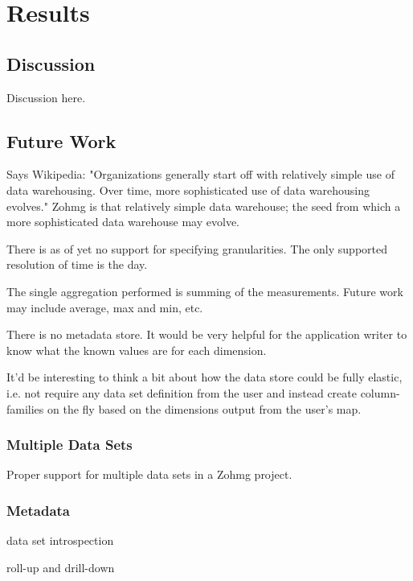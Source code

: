 \chapter{Results}



\section{Discussion}

Discussion here.


\section{Future Work}

Says Wikipedia: "Organizations generally start off with relatively simple use
of data warehousing. Over time, more sophisticated use of data warehousing
evolves." Zohmg is that relatively simple data warehouse; the seed from which
a more sophisticated data warehouse may evolve.

There is as of yet no support for specifying granularities. The only supported
resolution of time is the day.

The single aggregation performed is summing of the measurements. Future work
may include average, max and min, etc.

There is no metadata store. It would be very helpful for the application
writer to know what the known values are for each dimension.

It'd be interesting to think a bit about how the data store could be fully
elastic, i.e. not require any data set definition from the user and instead
create column-families on the fly based on the dimensions output from the
user's map.


\subsection*{Multiple Data Sets}

Proper support for multiple data sets in a Zohmg project.


\subsection*{Metadata}

data set introspection

roll-up and drill-down

